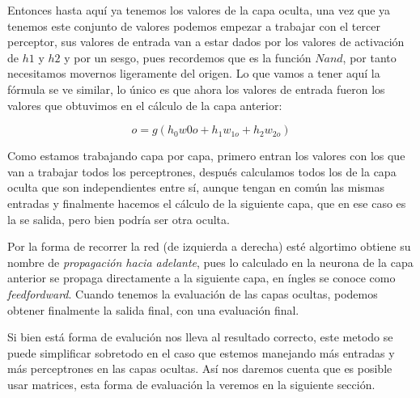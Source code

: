 Entonces hasta aquí ya tenemos los valores de la capa oculta, una vez que ya tenemos este conjunto de valores podemos empezar a trabajar con el tercer perceptor, sus valores de entrada van a estar dados por los valores de activación de $h1$ y $h2$ y por un  sesgo, pues recordemos que es la función $Nand$, por tanto necesitamos movernos ligeramente del origen. Lo que vamos a tener aquí la fórmula se ve similar, lo único  es que ahora los valores de entrada fueron los valores que obtuvimos en el cálculo de la capa anterior:

\begin{equation}
  o = g( h_{0}w{0o} + h_{1}w_{1o} + h_{2}w_{2o})
\end{equation}

Como estamos trabajando capa por capa, primero entran los valores con los que van a trabajar todos los perceptrones, después calculamos todos los de la capa oculta que son independientes entre sí, aunque tengan en común las mismas entradas y finalmente hacemos el cálculo de la siguiente capa, que en ese caso es la se salida, pero bien podría ser otra oculta. 

Por la forma de recorrer la red (de izquierda a derecha) esté algortimo obtiene su nombre de \emph{propagación hacia adelante}, pues lo calculado en la neurona de la capa anterior se propaga directamente a la siguiente capa, en íngles se conoce como \textit{feedfordward}. Cuando tenemos la evaluación de las capas ocultas, podemos obtener finalmente la salida final, con una evaluación final.

Si bien está forma de evalución nos lleva al resultado correcto, este metodo se puede simplificar sobretodo en el caso que estemos manejando más entradas y más perceptrones en las capas ocultas. Así nos daremos cuenta que es posible usar matrices, esta forma de evaluación la veremos en la siguiente sección.
